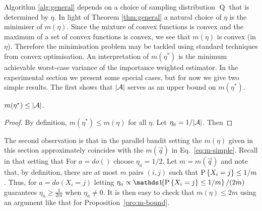 Algorithm \ref{alg:general} depends on a choice of sampling distribution $\operatorname{Q}$ that is determined by $\eta$. In light of Theorem \ref{thm:general}
a natural choice of $\eta$ is the minimiser of $m(\eta)$.
Since the mixture of convex functions is convex and the maximum of a set of convex functions is convex, we see that $m(\eta)$ is convex (in $\eta$).
Therefore the minimisation problem may be tackled using standard techniques from convex optimisation. 
An interpretation of $m(\eta^*)$ is the minimum achievable worst-case variance of the importance weighted estimator.
In the experimental section we present some special cases,
but for now we give two simple results. The first shows that $|\calA|$ serves as an upper bound on $m(\eta^*)$.

\begin{proposition}\label{pro:m-bound}
$m(\eta^*) \leq |\calA|$.
\end{proposition}

\begin{proof}
By definition, $m(\eta^*) \leq m(\eta)$ for all $\eta$. Let $\eta_a = 1/|\calA|$. Then
\end{proof}

The second observation is that in the parallel bandit setting the $m(\eta)$ given in this section approximately coincides with the $m(\vec{q})$ in Eq.\ \ref{eq:m-simple}.
Recall in that setting that 
For $a = do()$ choose $\eta_a = 1/2$. 
Let $m = m(\vec{q})$ and note that, by definition, there are at most $m$ pairs $(i,j)$ such that $\P{X_i = j} \leq 1/m$.
Thus, for $a = do(X_i = j)$ letting $\eta_a \propto \ind{\P{X_i = j} \leq 1/m} / (2m)$ guarantees $\eta_a \ge \frac{1}{2m}$ when $\eta_a \ne 0$.
It is then easy to check that $m(\eta) \leq 2m$ using an argument like that for Proposition~\ref{pro:m-bound}.

